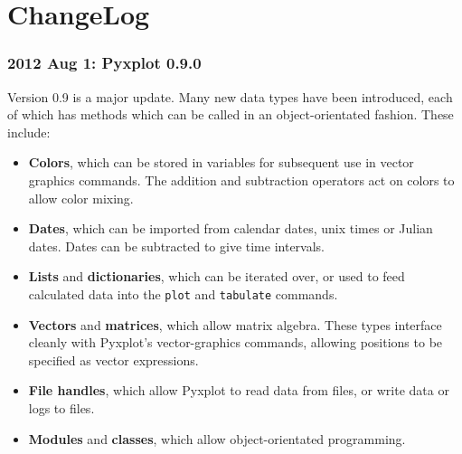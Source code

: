 %
%
%
%
%



\chapter{ChangeLog}

\subsection*{2012 Aug 1: Pyxplot 0.9.0}

Version 0.9 is a major update. Many new data types have been introduced, each
of which has methods which can be called in an object-orientated fashion. These
include:

\begin{itemize}
\item {\bf Colors}, which can be stored in variables for subsequent use in vector graphics commands. The addition and subtraction operators act on colors to allow color mixing.
\item {\bf Dates}, which can be imported from calendar dates, unix times or Julian dates. Dates can be subtracted to give time intervals.
\item {\bf Lists} and {\bf dictionaries}, which can be iterated over, or used to feed calculated data into the {\tt plot} and {\tt tabulate} commands.
\item {\bf Vectors} and {\bf matrices}, which allow matrix algebra. These types interface cleanly with Pyxplot's vector-graphics commands, allowing positions to be specified as vector expressions.
\item {\bf File handles}, which allow Pyxplot to read data from files, or write data or logs to files.
\item {\bf Modules} and {\bf classes}, which allow object-orientated programming.
\end{itemize}

